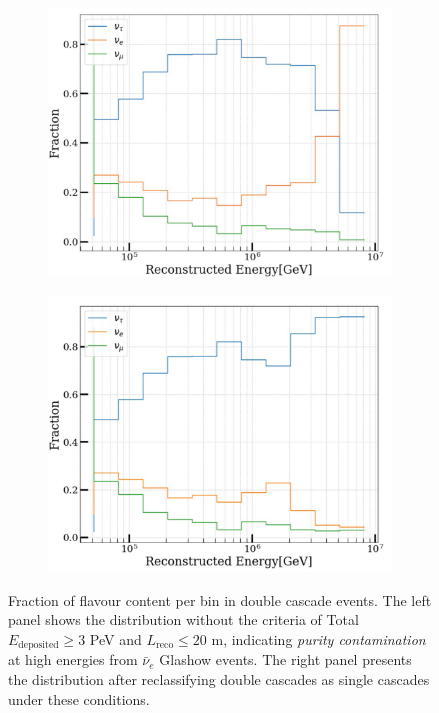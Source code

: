 \begin{figure}[h!]
    \begin{subfigure}[h]{0.7\textwidth}
        \includegraphics{./figures/EventSample/fraction_nomask.pdf}
    \end{subfigure}
    \hfill
    \begin{subfigure}[h]{0.7\textwidth}
        \includegraphics{./figures/EventSample/fraction_withmask.pdf}
       
    \end{subfigure}%
    \caption[Fraction of flavour content per bin in double cascade events]{Fraction of flavour content per bin in double cascade events. The left panel shows the distribution without the criteria of Total \( E_{\text{deposited}} \geq 3 \) PeV and \( L_{\text{reco}} \leq 20 \) m, indicating \emph{purity contamination} at high energies from \( \bar{\nu}_e \) Glashow events. The right panel presents the distribution after reclassifying double cascades as single cascades under these conditions.}
\end{figure}

